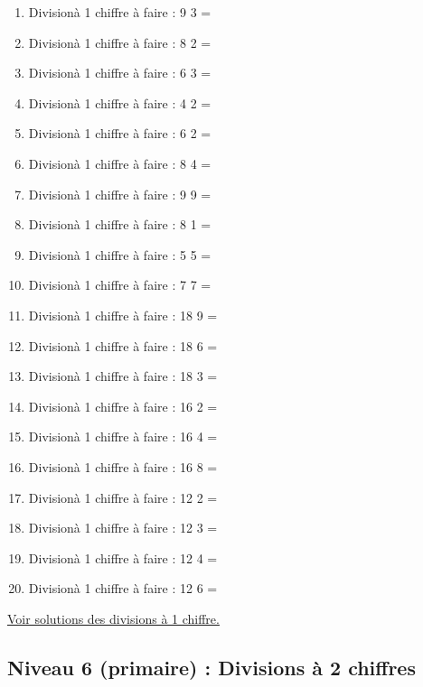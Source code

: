 \documentclass[11pt]{article}
\begin{document}
\begin{enumerate}
\item Divisionà 1 chiffre à faire :  9 \textdiv{} 3 =
\item Divisionà 1 chiffre à faire :  8 \textdiv{} 2 =
\item Divisionà 1 chiffre à faire :  6 \textdiv{} 3 =
\item Divisionà 1 chiffre à faire :  4 \textdiv{} 2 =
\item Divisionà 1 chiffre à faire :  6 \textdiv{} 2 =
\item Divisionà 1 chiffre à faire :  8 \textdiv{} 4 =
\item Divisionà 1 chiffre à faire :  9 \textdiv{} 9 =
\item Divisionà 1 chiffre à faire :  8 \textdiv{} 1 =
\item Divisionà 1 chiffre à faire :  5 \textdiv{} 5 =
\item Divisionà 1 chiffre à faire :  7 \textdiv{} 7 =
\item Divisionà 1 chiffre à faire :  18 \textdiv{} 9 =
\item Divisionà 1 chiffre à faire :  18 \textdiv{} 6 =
\item Divisionà 1 chiffre à faire :  18 \textdiv{} 3 =
\item Divisionà 1 chiffre à faire :  16 \textdiv{} 2 =
\item Divisionà 1 chiffre à faire :  16 \textdiv{} 4 =
\item Divisionà 1 chiffre à faire :  16 \textdiv{} 8 =
\item Divisionà 1 chiffre à faire :  12 \textdiv{} 2 =
\item Divisionà 1 chiffre à faire :  12 \textdiv{} 3 =
\item Divisionà 1 chiffre à faire :  12 \textdiv{} 4 =
\item Divisionà 1 chiffre à faire :  12 \textdiv{} 6 =
\end{enumerate}




\hyperref[org21b00c7]{Voir solutions des divisions à 1 chiffre.}




\newpage


\subsection{Niveau 6 (primaire) : Divisions à 2 chiffres}
\label{sec:org58f6a32}
\label{org2969313}
\end{document}

